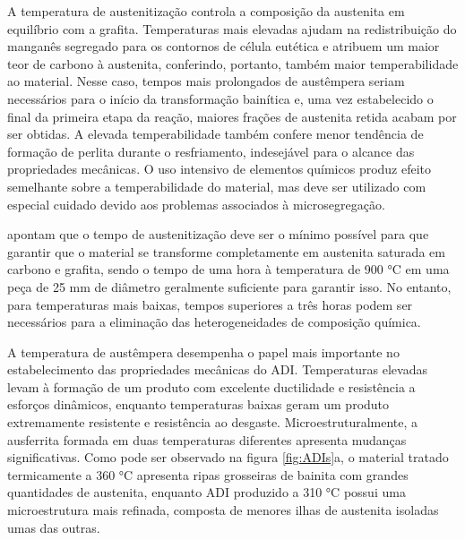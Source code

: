 A temperatura de austenitização controla a composição da austenita em equilíbrio com a grafita. Temperaturas mais elevadas ajudam na redistribuição do manganês segregado para os contornos de célula eutética e atribuem um maior teor de carbono à austenita, conferindo, portanto, também maior temperabilidade ao material. Nesse caso, tempos mais prolongados de austêmpera seriam necessários para o início da transformação bainítica e, uma vez estabelecido o final da primeira etapa da reação, maiores frações de austenita retida acabam por ser obtidas. A elevada temperabilidade também confere menor tendência de formação de perlita durante o resfriamento, indesejável para o alcance das propriedades mecânicas\cite{Trudel1997}. O uso intensivo de elementos químicos produz efeito semelhante sobre a temperabilidade do material, mas deve ser utilizado com especial cuidado devido aos problemas associados à microsegregação\cite{Bayati1995,Velez1996}.

 apontam que o tempo de austenitização deve ser o mínimo possível para que garantir que o material se transforme completamente em austenita saturada em carbono e grafita, sendo o tempo de uma hora à temperatura de 900 °C em uma peça de 25 mm de diâmetro geralmente suficiente para garantir isso. No entanto, para temperaturas mais baixas, tempos superiores a três horas podem ser necessários para a eliminação das heterogeneidades de composição química.

A temperatura de austêmpera desempenha o papel mais importante no estabelecimento das propriedades mecânicas do ADI. Temperaturas elevadas levam à formação de um produto com excelente ductilidade e resistência a esforços dinâmicos, enquanto temperaturas baixas geram um produto extremamente resistente e resistência ao desgaste\cite{Lin1996,Aranzabal1997,Magalhaes1998}. Microestruturalmente, a ausferrita formada em duas temperaturas diferentes apresenta mudanças significativas. Como pode ser observado na figura \ref{fig:ADIs}a, o material tratado termicamente a 360 °C apresenta ripas grosseiras de bainita com grandes quantidades de austenita, enquanto ADI produzido a 310 °C possui uma microestrutura mais refinada, composta de menores ilhas de austenita isoladas umas das outras.

